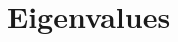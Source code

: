 \documentclass[submission]{FPSAC2026}
\newcommand{\Set}{\operatorname{Set}}
\newcommand{\cLRM}{\operatorname{cLRM}}
\begin{document}


\section{Eigenvalues}
\label{sec.evals}
\end{document}
